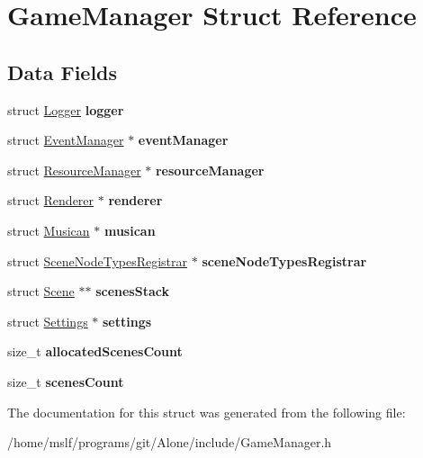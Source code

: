 \hypertarget{struct_game_manager}{}\section{Game\+Manager Struct Reference}
\label{struct_game_manager}
\subsection*{Data Fields}
\begin{DoxyCompactItemize}
\item 
\hypertarget{struct_game_manager_a7a4db212ea06ad60af39668b7e267adc}{}\label{struct_game_manager_a7a4db212ea06ad60af39668b7e267adc} 
struct \hyperlink{struct_logger}{Logger} {\bfseries logger}
\item 
\hypertarget{struct_game_manager_a0271577c2a84bcbcd2e51bcea2e50506}{}\label{struct_game_manager_a0271577c2a84bcbcd2e51bcea2e50506} 
struct \hyperlink{struct_event_manager}{Event\+Manager} $\ast$ {\bfseries event\+Manager}
\item 
\hypertarget{struct_game_manager_a93fdfea6f603cf523a678110e9179ab1}{}\label{struct_game_manager_a93fdfea6f603cf523a678110e9179ab1} 
struct \hyperlink{struct_resource_manager}{Resource\+Manager} $\ast$ {\bfseries resource\+Manager}
\item 
\hypertarget{struct_game_manager_a7408e04e761a481eee003a02425d99b6}{}\label{struct_game_manager_a7408e04e761a481eee003a02425d99b6} 
struct \hyperlink{struct_renderer}{Renderer} $\ast$ {\bfseries renderer}
\item 
\hypertarget{struct_game_manager_a106db72962d8e9542c1662085e26950a}{}\label{struct_game_manager_a106db72962d8e9542c1662085e26950a} 
struct \hyperlink{struct_musican}{Musican} $\ast$ {\bfseries musican}
\item 
\hypertarget{struct_game_manager_a3ab0b6f9ff843ee538fa32b3fc03ce44}{}\label{struct_game_manager_a3ab0b6f9ff843ee538fa32b3fc03ce44} 
struct \hyperlink{struct_scene_node_types_registrar}{Scene\+Node\+Types\+Registrar} $\ast$ {\bfseries scene\+Node\+Types\+Registrar}
\item 
\hypertarget{struct_game_manager_ab38a16090655f6b9ad92d601ba0d4777}{}\label{struct_game_manager_ab38a16090655f6b9ad92d601ba0d4777} 
struct \hyperlink{struct_scene}{Scene} $\ast$$\ast$ {\bfseries scenes\+Stack}
\item 
\hypertarget{struct_game_manager_a10fc65a0d15969d43d61d98b924beabb}{}\label{struct_game_manager_a10fc65a0d15969d43d61d98b924beabb} 
struct \hyperlink{struct_settings}{Settings} $\ast$ {\bfseries settings}
\item 
\hypertarget{struct_game_manager_a56f24315504445ab6006dde1c656145f}{}\label{struct_game_manager_a56f24315504445ab6006dde1c656145f} 
size\+\_\+t {\bfseries allocated\+Scenes\+Count}
\item 
\hypertarget{struct_game_manager_ab0af7f842ec3b7e323852a9fbd8a2b2f}{}\label{struct_game_manager_ab0af7f842ec3b7e323852a9fbd8a2b2f} 
size\+\_\+t {\bfseries scenes\+Count}
\end{DoxyCompactItemize}


The documentation for this struct was generated from the following file\+:\begin{DoxyCompactItemize}
\item 
/home/mslf/programs/git/\+Alone/include/Game\+Manager.\+h\end{DoxyCompactItemize}
